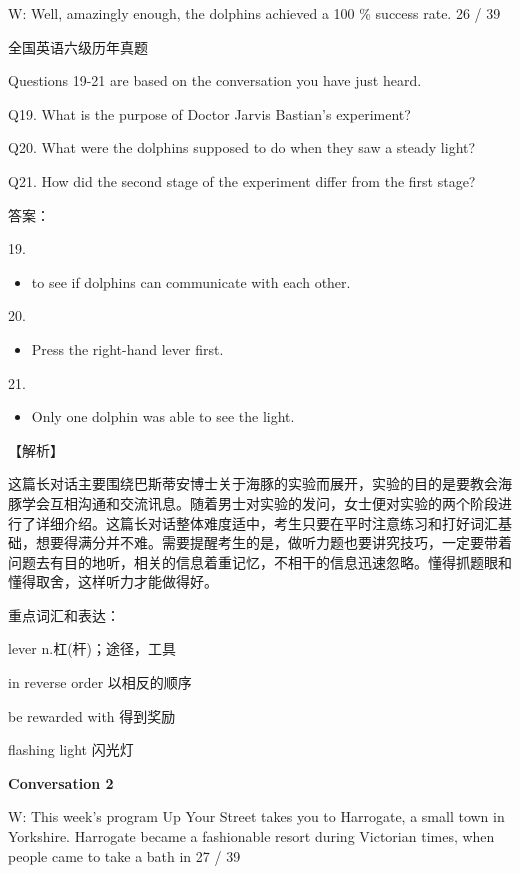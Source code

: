 \documentclass[UTF8,11pt]{ctexart}
\begin{document}
W: Well, amazingly enough, the dolphins achieved a 100 \% success rate. 26 / 39


全国英语六级历年真题


Questions 19-21 are based on the conversation you have just heard.


Q19. What is the purpose of Doctor Jarvis Bastian’s experiment?


Q20. What were the dolphins supposed to do when they saw a steady light?


Q21. How did the second stage of the experiment differ from the first stage?


答案：


19.


\begin{itemize}[leftmargin=2em,itemsep=.2em,topsep=.4em]\item[D.] to see if dolphins can communicate with each other.
\end{itemize}

20.


\begin{itemize}[leftmargin=2em,itemsep=.2em,topsep=.4em]\item[A.] Press the right-hand lever first.
\end{itemize}

21.


\begin{itemize}[leftmargin=2em,itemsep=.2em,topsep=.4em]\item[C.] Only one dolphin was able to see the light.
\end{itemize}

【解析】


这篇长对话主要围绕巴斯蒂安博士关于海豚的实验而展开，实验的目的是要教会海豚学会互相沟通和交流讯息。随着男士对实验的发问，女士便对实验的两个阶段进行了详细介绍。这篇长对话整体难度适中，考生只要在平时注意练习和打好词汇基础，想要得满分并不难。需要提醒考生的是，做听力题也要讲究技巧，一定要带着问题去有目的地听，相关的信息着重记忆，不相干的信息迅速忽略。懂得抓题眼和懂得取舍，这样听力才能做得好。


重点词汇和表达：


lever n.杠(杆)；途径，工具


in reverse order 以相反的顺序


be rewarded with 得到奖励


flashing light 闪光灯


\textbf{Conversation 2}


W: This week’s program Up Your Street takes you to Harrogate, a small town in Yorkshire. Harrogate became a fashionable resort during Victorian times, when people came to take a bath in 27 / 39
\end{document}
